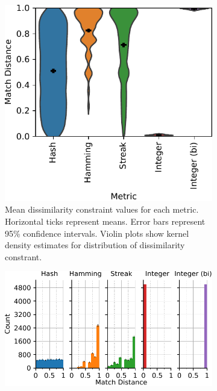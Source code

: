 \begin{figure}[!htbp]
\begin{center}
\begin{subfigure}[b]{\linewidth}
\begin{minipage}{0.6\linewidth}
\includegraphics[width=\linewidth]{img/sphere_reverse/bitweight=0dot5+seed=1+title=dimensionality_violinplot+_data_hathash_hash=93f97a11cb443d35+_script_fullcat_hash=d1692569f79e33f8+ext=}
\end{minipage}
\begin{minipage}{0.35\linewidth}
\caption{
Mean dissimilarity constraint values for each metric.
Horizontal ticks represent means.
Error bars represent 95\% confidence intervals.
Violin plots show kernel density estimates for distribution of dissimilarity constrant.
}
\label{fig:sphere_reverse_distnplot}
\end{minipage}
\end{subfigure}
\begin{subfigure}[b]{\columnwidth}
\centering
\includegraphics[width=\columnwidth]{img/sphere_reverse/bitweight=0dot5+seed=1+title=dimensionality_distnplot+viz=hist+_data_hathash_hash=93f97a11cb443d35+_script_fullcat_hash=cda229fb13f5a152+ext=}

\end{subfigure}
\end{center}
\end{figure}
